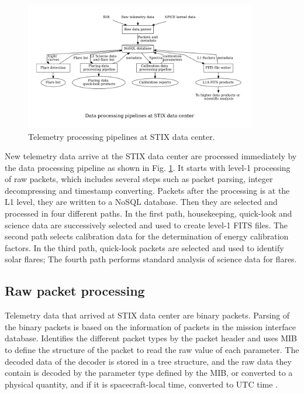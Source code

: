 \documentclass[referee]{aa} %
\begin{document}
\begin{figure}
    \centering
    \includegraphics[width=0.9\textwidth]{figures/pipelines.pdf}
    \caption{Telemetry processing pipelines at STIX data center.}
    \label{fig:main_pipelines}
\end{figure}
New telemetry data arrive at the STIX data center are processed immediately by the data processing pipeline  
as shown in Fig. \ref{fig:main_pipelines}. 
It starts with level-1 processing of raw packets, which includes several steps such as  packet parsing, 
integer decompressing and timestamp converting. 
Packets after the processing is at the L1 level, they are written to a NoSQL database. 
Then they are selected and processed in four different paths. 
In the first path,  housekeeping, quick-look and science data are successively selected and 
used to create level-1 FITS files. The second path selects calibration data for the determination
 of energy calibration factors. 
 In the third path, quick-look packets are selected and used to identify solar
flares; The fourth path performs standard analysis of science data for flares.

\subsection{Raw packet processing}
Telemetry data that arrived at STIX data center are binary packets. 
Parsing of the binary packets is  based on the information of packets in 
the mission interface database. Identifies the different packet types 
by the packet header and uses MIB to define the structure of 
the packet to read the raw value of each parameter. 
The decoded data of the decoder is stored in a tree structure, and 
the raw data they contain is decoded by the parameter type defined by the MIB, 
or converted to a physical quantity, and if it is spacecraft-local time, 
converted to UTC time . 
\end{document}
